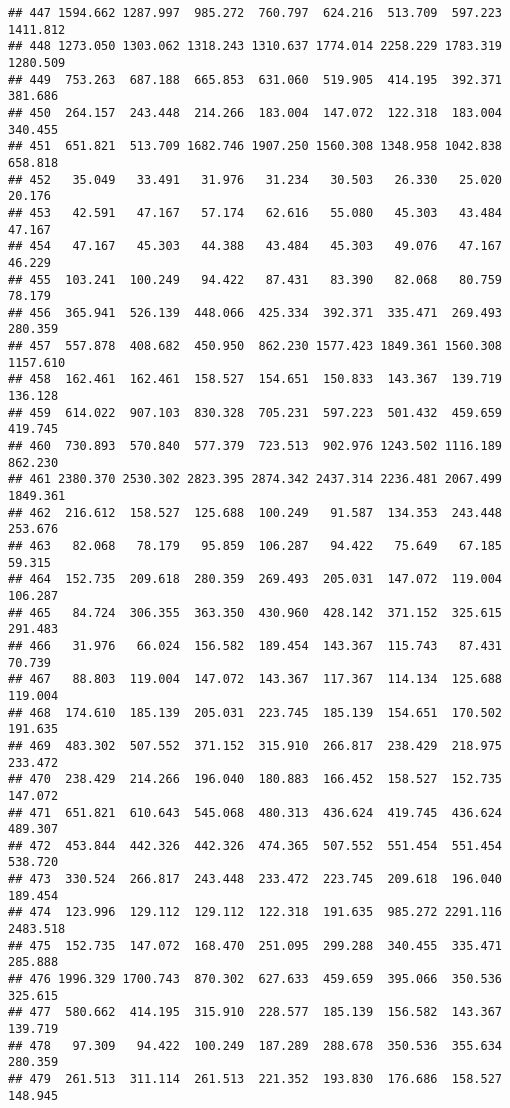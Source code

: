 \documentclass[
]{article}
\begin{document}
\begin{verbatim}
## 447 1594.662 1287.997  985.272  760.797  624.216  513.709  597.223 1411.812
## 448 1273.050 1303.062 1318.243 1310.637 1774.014 2258.229 1783.319 1280.509
## 449  753.263  687.188  665.853  631.060  519.905  414.195  392.371  381.686
## 450  264.157  243.448  214.266  183.004  147.072  122.318  183.004  340.455
## 451  651.821  513.709 1682.746 1907.250 1560.308 1348.958 1042.838  658.818
## 452   35.049   33.491   31.976   31.234   30.503   26.330   25.020   20.176
## 453   42.591   47.167   57.174   62.616   55.080   45.303   43.484   47.167
## 454   47.167   45.303   44.388   43.484   45.303   49.076   47.167   46.229
## 455  103.241  100.249   94.422   87.431   83.390   82.068   80.759   78.179
## 456  365.941  526.139  448.066  425.334  392.371  335.471  269.493  280.359
## 457  557.878  408.682  450.950  862.230 1577.423 1849.361 1560.308 1157.610
## 458  162.461  162.461  158.527  154.651  150.833  143.367  139.719  136.128
## 459  614.022  907.103  830.328  705.231  597.223  501.432  459.659  419.745
## 460  730.893  570.840  577.379  723.513  902.976 1243.502 1116.189  862.230
## 461 2380.370 2530.302 2823.395 2874.342 2437.314 2236.481 2067.499 1849.361
## 462  216.612  158.527  125.688  100.249   91.587  134.353  243.448  253.676
## 463   82.068   78.179   95.859  106.287   94.422   75.649   67.185   59.315
## 464  152.735  209.618  280.359  269.493  205.031  147.072  119.004  106.287
## 465   84.724  306.355  363.350  430.960  428.142  371.152  325.615  291.483
## 466   31.976   66.024  156.582  189.454  143.367  115.743   87.431   70.739
## 467   88.803  119.004  147.072  143.367  117.367  114.134  125.688  119.004
## 468  174.610  185.139  205.031  223.745  185.139  154.651  170.502  191.635
## 469  483.302  507.552  371.152  315.910  266.817  238.429  218.975  233.472
## 470  238.429  214.266  196.040  180.883  166.452  158.527  152.735  147.072
## 471  651.821  610.643  545.068  480.313  436.624  419.745  436.624  489.307
## 472  453.844  442.326  442.326  474.365  507.552  551.454  551.454  538.720
## 473  330.524  266.817  243.448  233.472  223.745  209.618  196.040  189.454
## 474  123.996  129.112  129.112  122.318  191.635  985.272 2291.116 2483.518
## 475  152.735  147.072  168.470  251.095  299.288  340.455  335.471  285.888
## 476 1996.329 1700.743  870.302  627.633  459.659  395.066  350.536  325.615
## 477  580.662  414.195  315.910  228.577  185.139  156.582  143.367  139.719
## 478   97.309   94.422  100.249  187.289  288.678  350.536  355.634  280.359
## 479  261.513  311.114  261.513  221.352  193.830  176.686  158.527  148.945

\end{verbatim}
\end{document}
